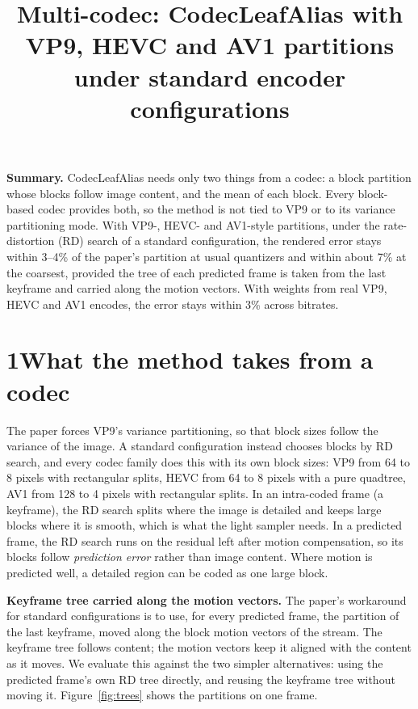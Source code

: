 \documentclass[10pt]{article}
\title{\vspace{-1.6em}Multi-codec: CodecLeafAlias with VP9, HEVC and AV1 partitions\\ under standard encoder configurations}
\author{}
\date{\vspace{-2.4em}}
\begin{document}
\maketitle
\vspace{-1.0em}

\textbf{Summary.} CodecLeafAlias needs only two things from a codec: a block partition whose blocks follow image content, and the mean of each block. Every block-based codec provides both, so the method is not tied to VP9 or to its variance partitioning mode. With VP9-, HEVC- and AV1-style partitions, under the rate-distortion (RD) search of a standard configuration, the rendered error stays within 3--4\% of the paper's partition at usual quantizers and within about 7\% at the coarsest, provided the tree of each predicted frame is taken from the last keyframe and carried along the motion vectors. With weights from real VP9, HEVC and AV1 encodes, the error stays within 3\% across bitrates.

\section*{1\quad What the method takes from a codec}

The paper forces VP9's variance partitioning, so that block sizes follow the variance of the image. A standard configuration instead chooses blocks by RD search, and every codec family does this with its own block sizes: VP9 from 64 to 8 pixels with rectangular splits, HEVC from 64 to 8 pixels with a pure quadtree, AV1 from 128 to 4 pixels with rectangular splits. In an intra-coded frame (a keyframe), the RD search splits where the image is detailed and keeps large blocks where it is smooth, which is what the light sampler needs. In a predicted frame, the RD search runs on the residual left after motion compensation, so its blocks follow \emph{prediction error} rather than image content. Where motion is predicted well, a detailed region can be coded as one large block.

\textbf{Keyframe tree carried along the motion vectors.} The paper's workaround for standard configurations is to use, for every predicted frame, the partition of the last keyframe, moved along the block motion vectors of the stream. The keyframe tree follows content; the motion vectors keep it aligned with the content as it moves. We evaluate this against the two simpler alternatives: using the predicted frame's own RD tree directly, and reusing the keyframe tree without moving it. Figure~\ref{fig:trees} shows the partitions on one frame.
\end{document}
